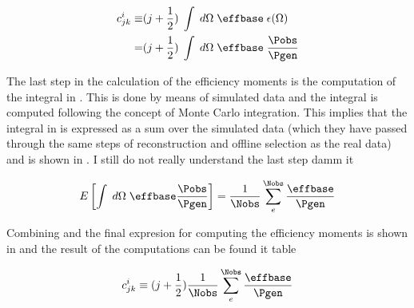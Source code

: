 \begin{center}
\begin{align}
   c^i_{jk}  \equiv &(j + \frac{1}{2}) \; \int \; d\Omega \; \effbase \; \epsilon(\Omega) \nonumber \\ 
                 = &(j + \frac{1}{2}) \; \int \; d\Omega \; \effbase \; \frac{\Pobs}{\Pgen}
  \label{eff_moms_def}
\end{align}
\end{center}

\noindent The last step in the calculation of the efficiency moments is the computation of the integral in .
This is done by means of simulated data and the integral is computed following the concept of Monte Carlo integration. This implies
that the integral in  is expressed as a sum over the simulated data (which they have passed through the same 
steps of reconstruction and offline selection as the real data) and is shown in . {\color{red} I still do not really understand the last step damm it}   

\begin{center}
\begin{equation}
  E\left[ \int \; d\Omega \; \effbase \frac{\Pobs}{\Pgen} \right] = \frac{1}{\Nobs} \sum_e^{\Nobs} \frac{\effbase}{\Pgen}  
  \label{eff_moms_calc}
\end{equation}
\end{center}

\noindent Combining  and  the final expresion for computing the efficiency moments is shown
in  and the result of the computations can be found it table   

\begin{center}
\begin{equation}
 c^i_{jk} \equiv (j + \frac{1}{2})  \frac{1}{\Nobs} \sum_e^{\Nobs} \frac{\effbase}{\Pgen}  
  \label{eff_moms_calc_final}
\end{equation}
\end{center}

